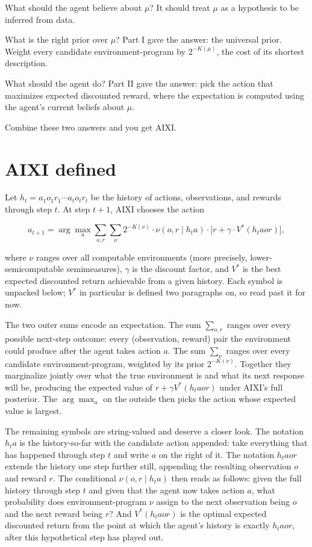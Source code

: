 What should the agent believe about $\mu$? It should treat $\mu$ as a hypothesis to be inferred from data.

What is the right prior over $\mu$? Part I gave the answer: the universal prior. Weight every candidate environment-program by $2^{-K(\mu)}$, the cost of its shortest description.

What should the agent do? Part II gave the answer: pick the action that maximizes expected discounted reward, where the expectation is computed using the agent's current beliefs about $\mu$.

Combine these two answers and you get AIXI.

\section*{AIXI defined}

Let $h_t = a_1 o_1 r_1 \cdots a_t o_t r_t$ be the history of actions, observations, and rewards through step $t$. At step $t+1$, AIXI chooses the action

$$a_{t+1} = \arg\max_a \sum_{o, r} \sum_\nu 2^{-K(\nu)} \cdot \nu(o, r \mid h_t a) \cdot \big[r + \gamma \cdot V^*(h_t a o r)\big],$$

where $\nu$ ranges over all computable environments (more precisely, lower-semicomputable semimeasures), $\gamma$ is the discount factor, and $V^*$ is the best expected discounted return achievable from a given history. Each symbol is unpacked below; $V^*$ in particular is defined two paragraphs on, so read past it for now.

The two outer sums encode an expectation. The sum $\sum_{o, r}$ ranges over every possible next-step outcome: every (observation, reward) pair the environment could produce after the agent takes action $a$. The sum $\sum_\nu$ ranges over every candidate environment-program, weighted by its prior $2^{-K(\nu)}$. Together they marginalize jointly over what the true environment is and what its next response will be, producing the expected value of $r + \gamma V^*(h_t a o r)$ under AIXI's full posterior. The $\arg\max_a$ on the outside then picks the action whose expected value is largest.

The remaining symbols are string-valued and deserve a closer look. The notation $h_t a$ is the history-so-far with the candidate action appended: take everything that has happened through step $t$ and write $a$ on the right of it. The notation $h_t a o r$ extends the history one step further still, appending the resulting observation $o$ and reward $r$. The conditional $\nu(o, r \mid h_t a)$ then reads as follows: given the full history through step $t$ and given that the agent now takes action $a$, what probability does environment-program $\nu$ assign to the next observation being $o$ and the next reward being $r$? And $V^*(h_t a o r)$ is the optimal expected discounted return from the point at which the agent's history is exactly $h_t a o r$, after this hypothetical step has played out.

